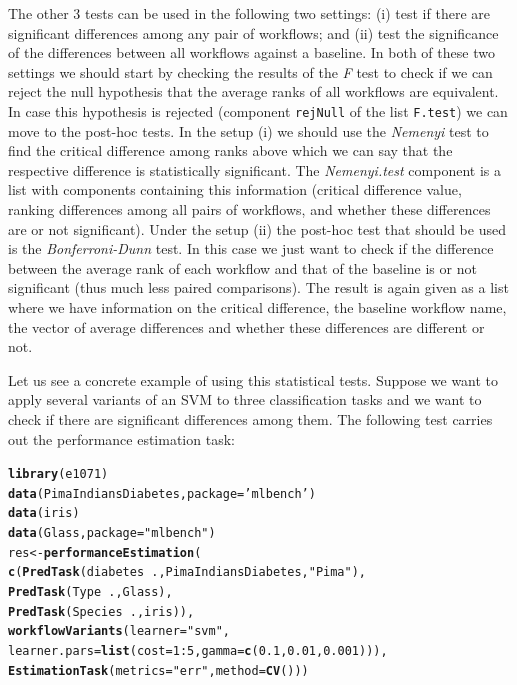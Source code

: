\documentclass[10pt,a4paper]{article}\usepackage[]{graphicx}\usepackage[]{color}
\makeatletter
\newcommand{\hlnum}[1]{\textcolor[rgb]{0.686,0.059,0.569}{#1}}%
\newcommand{\hlstr}[1]{\textcolor[rgb]{0.192,0.494,0.8}{#1}}%
\newcommand{\hlopt}[1]{\textcolor[rgb]{0,0,0}{#1}}%
\newcommand{\hlstd}[1]{\textcolor[rgb]{0.345,0.345,0.345}{#1}}%
\newcommand{\hlkwb}[1]{\textcolor[rgb]{0.69,0.353,0.396}{#1}}%
\newcommand{\hlkwc}[1]{\textcolor[rgb]{0.333,0.667,0.333}{#1}}%
\newcommand{\hlkwd}[1]{\textcolor[rgb]{0.737,0.353,0.396}{\textbf{#1}}}%
\newenvironment{kframe}{%
 \def\at@end@of@kframe{}%
 \ifinner\ifhmode%
  \def\at@end@of@kframe{\end{minipage}}%
  \begin{minipage}{\columnwidth}%
 \fi\fi%
 \def\FrameCommand##1{\hskip\@totalleftmargin \hskip-\fboxsep
 \colorbox{shadecolor}{##1}\hskip-\fboxsep
     \hskip-\linewidth \hskip-\@totalleftmargin \hskip\columnwidth}%
 \MakeFramed {\advance\hsize-\width
   \@totalleftmargin\z@ \linewidth\hsize
   \@setminipage}}%
 {\par\unskip\endMakeFramed%
 \at@end@of@kframe}
\newenvironment{knitrout}{}{} %
\makeatother
\begin{document}
The other 3 tests can be used in the following two settings: (i) test if there are significant differences among any pair of workflows; and (ii) test the significance of the differences between all workflows against a baseline. In both of these two settings we should start by checking the results of the  \textit{F} test to check if we can reject the null hypothesis that the average ranks of all workflows are equivalent. In case this hypothesis is rejected (component \texttt{rejNull} of the list \texttt{F.test}) we can move to the post-hoc tests. In the setup (i) we should use the \textit{Nemenyi} test to find the critical difference among ranks above which we can say that the respective difference is statistically significant. The \textit{Nemenyi.test} component is a list with components containing this information (critical difference value, ranking differences among all pairs of workflows, and whether these differences are or not significant). Under the setup (ii) the post-hoc test that should be used is the \textit{Bonferroni-Dunn} test. In this case we just want to check if the difference between the average rank of each workflow and that of the baseline is or not significant (thus much less paired comparisons). The result is again given as a list where we have information on the critical difference, the baseline workflow name, the vector of average differences and whether these differences are different or not.

Let us see a concrete example of using this statistical tests. Suppose we want to apply several variants of an SVM to three classification tasks and we want to check if there are significant differences among them. The following test carries out the performance estimation task:

\begin{knitrout}\scriptsize
{}\color{fgcolor}\begin{kframe}
\begin{alltt}
\hlkwd{library}\hlstd{(e1071)}
\hlkwd{data}\hlstd{(PimaIndiansDiabetes,}\hlkwc{package}\hlstd{=}\hlstr{'mlbench'}\hlstd{)}
\hlkwd{data}\hlstd{(iris)}
\hlkwd{data}\hlstd{(Glass,}\hlkwc{package}\hlstd{=}\hlstr{"mlbench"}\hlstd{)}
\hlstd{res} \hlkwb{<-} \hlkwd{performanceEstimation}\hlstd{(}
    \hlkwd{c}\hlstd{(}\hlkwd{PredTask}\hlstd{(diabetes} \hlopt{~} \hlstd{.,PimaIndiansDiabetes,}\hlstr{"Pima"}\hlstd{),}
      \hlkwd{PredTask}\hlstd{(Type} \hlopt{~} \hlstd{., Glass),}
      \hlkwd{PredTask}\hlstd{(Species} \hlopt{~} \hlstd{.,iris)),}
    \hlkwd{workflowVariants}\hlstd{(}\hlkwc{learner}\hlstd{=}\hlstr{"svm"}\hlstd{,}
                     \hlkwc{learner.pars}\hlstd{=}\hlkwd{list}\hlstd{(}\hlkwc{cost}\hlstd{=}\hlnum{1}\hlopt{:}\hlnum{5}\hlstd{,}\hlkwc{gamma}\hlstd{=}\hlkwd{c}\hlstd{(}\hlnum{0.1}\hlstd{,}\hlnum{0.01}\hlstd{,}\hlnum{0.001}\hlstd{))),}
    \hlkwd{EstimationTask}\hlstd{(}\hlkwc{metrics}\hlstd{=}\hlstr{"err"}\hlstd{,}\hlkwc{method}\hlstd{=}\hlkwd{CV}\hlstd{()))}
\end{alltt}
\end{kframe}
\end{knitrout}
\end{document}
